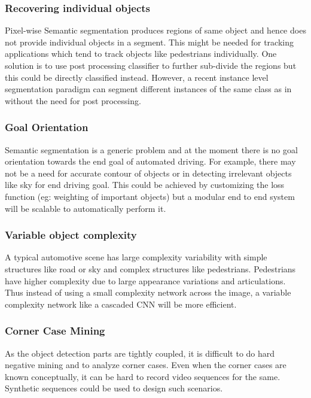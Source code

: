 \documentclass[conference]{IEEEtran}
\begin{document}
\subsubsection{\textbf{Recovering individual objects}} Pixel-wise Semantic segmentation produces regions of same object and hence does not provide individual objects in a segment. This might be needed for tracking applications which tend to track objects like pedestrians individually. One solution is to use post processing classifier to further sub-divide the regions but this could be directly classified instead. However, a recent instance level segmentation paradigm can segment different instances of the same class as in \cite{DBLP:journals/corr/DaiHLRS16} without the need for post processing.

\subsubsection{\textbf{Goal Orientation}} Semantic segmentation is a generic problem and at the moment there is no goal orientation towards the end goal of automated driving. For example, there may not be a need for accurate contour of objects or in detecting irrelevant objects like sky for end driving goal. This could be achieved by customizing the loss function (eg: weighting of important objects) but a modular end to end system will be scalable to automatically perform it. 

\subsubsection{\textbf{Variable object complexity}} A typical automotive scene has large  complexity variability with simple structures like road or sky and complex structures like pedestrians. Pedestrians have higher complexity due to large appearance variations and articulations. Thus instead of using a small complexity network across the image, a variable complexity network like a cascaded CNN \cite{li2017not} will be more efficient. 

\subsubsection{\textbf{Corner Case Mining}} As the object detection parts are tightly coupled, it is difficult to do hard negative mining and to analyze corner cases. Even when the corner cases are known conceptually, it can be hard to record video sequences for the same. Synthetic sequences could be used to design such scenarios.
\end{document}

